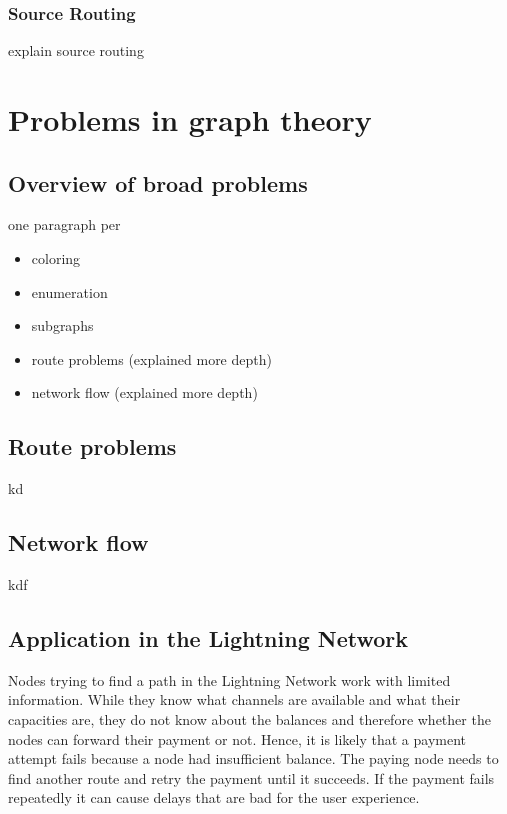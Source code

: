 \documentclass[final]{fhnwreport}       %
\begin{document}
\subsubsection{Source Routing}
explain source routing

\newpage
\section{Problems in graph theory}
\subsection{Overview of broad problems}
one paragraph per
\begin{itemize}
  \item coloring
  \item enumeration
  \item subgraphs
  \item route problems (explained more depth)
  \item network flow (explained more depth)
\end{itemize}

\subsection{Route problems}
kd
\subsection{Network flow}
kdf

\subsection{Application in the Lightning Network}

Nodes trying to find a path in the Lightning Network work with limited information. While they know what channels are available and what their capacities are, they do not know about the balances and therefore whether the nodes can forward their payment or not. Hence, it is likely that a payment attempt fails because a node had insufficient balance. The paying node needs to find another route and retry the payment until it succeeds. If the payment fails repeatedly it can cause delays that are bad for the user experience. 
\end{document}
